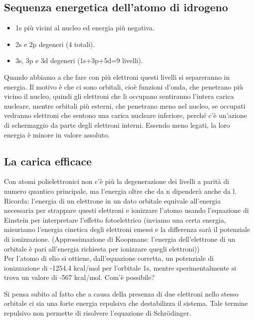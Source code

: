 \subsection{Sequenza energetica dell'atomo di idrogeno}
\begin{itemize}
  \item 1s più vicini al nucleo ed energia più negativa.
  \item 2s e 2p degeneri (4 totali).
  \item 3s, 3p e 3d degeneri (1s+3p+5d=9 livelli).
\end{itemize}
Quando abbiamo a che fare con più elettroni questi livelli si separeranno in energia. Il motivo è che ci sono orbitali, cioè funzioni d'onda, che penetrano più vicino il nucleo, quindi gli elettroni che li occupano sentiranno l'intera carica nucleare, mentre orbitali più esterni, che penetrano meno nel nucleo, se occupati vedranno elettroni che sentono una carica nucleare inferiore, perché c'è un'azione di schermaggio da parte degli elettroni interni. Essendo meno legati, la loro energia è minore in valore assoluto.
\subsection{La carica efficace}
Con atomi polielettronici non c'è più la degenerazione dei livelli a parità di numero quantico principale, ma l'energia oltre che da n dipenderà anche da l.\\

Ricorda: l'energia di un elettrone in un dato orbitale  equivale all'energia necessaria per strappare questi elettroni e ionizzare l'atomo usando l'equazione di Einstein per interpretare l'effetto fotoelettrico (inviamo una certa energia, misuriamo l'energia cinetica degli elettroni emessi e la differenza sarà il potenziale di ionizzazione. (Approssimazione di Koopmans: l'energia dell'elettrone di un orbitale è pari all'energia richiesta per ionizzare quegli elettroni))\\

Per l'atomo di elio si ottiene, dall'equazione corretta, un potenziale di ionizzazione di -1254.4 kcal/mol per l'orbitale 1s, mentre sperimentalmente si trova un valore di -567 kcal/mol. Com'è possibile?

Si pensa subito al fatto che a causa della presenza di due elettroni nello stesso orbitale ci sia una forte energia repulsiva che destabilizza il sistema. Tale termine repulsivo non permette di risolvere l'equazione di Schrödinger.

